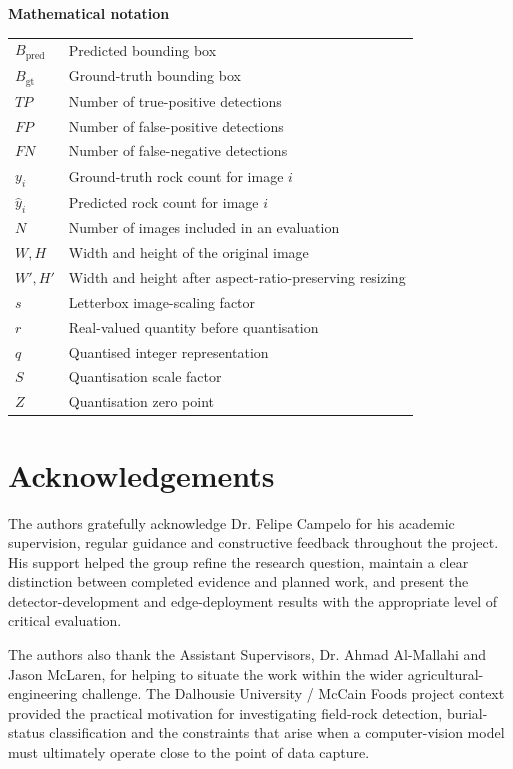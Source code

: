 \documentclass[
                    author={\shortstack{Tanishk Nanasaheb Shinde\\Megh Kashilkar\\Sanskar Sanju Gade\\Jitendra Suwalka}},
                    supervisor={\begin{tabular}[t]{@{}l@{}}Dr. Felipe Campelo\\Assistant Supervisors: Dr. Ahmad Al-Mallahi\\(Dalhousie University / McCain Foods representative) and Jason McLaren\end{tabular}},
                    degree={MSc},
                    title={Edge-Deployable Rock Detection and Burial Status Classification},
                    subtitle={},
                    type={},
                      year={2026}]{dissertation}
\begin{document}
\vspace{0.7cm}
\noindent
\textbf{Mathematical notation}

\vspace{0.3cm}
\begin{tabular}{p{2.7cm}p{11.1cm}}
$B_{\mathrm{pred}}$ & Predicted bounding box \\
$B_{\mathrm{gt}}$ & Ground-truth bounding box \\
$TP$ & Number of true-positive detections \\
$FP$ & Number of false-positive detections \\
$FN$ & Number of false-negative detections \\
$y_i$ & Ground-truth rock count for image $i$ \\
$\hat{y}_i$ & Predicted rock count for image $i$ \\
$N$ & Number of images included in an evaluation \\
$W,H$ & Width and height of the original image \\
$W',H'$ & Width and height after aspect-ratio-preserving resizing \\
$s$ & Letterbox image-scaling factor \\
$r$ & Real-valued quantity before quantisation \\
$q$ & Quantised integer representation \\
$S$ & Quantisation scale factor \\
$Z$ & Quantisation zero point \\
\end{tabular}


\chapter*{Acknowledgements}

\noindent
The authors gratefully acknowledge Dr. Felipe Campelo for his academic supervision,
regular guidance and constructive feedback throughout the project. His support helped the
group refine the research question, maintain a clear distinction between completed evidence
and planned work, and present the detector-development and edge-deployment results with the
appropriate level of critical evaluation.

The authors also thank the Assistant Supervisors, Dr. Ahmad Al-Mallahi and Jason McLaren,
for helping to situate the work within the wider agricultural-engineering challenge. The
Dalhousie University / McCain Foods project context provided the practical motivation for
investigating field-rock detection, burial-status classification and the constraints that
arise when a computer-vision model must ultimately operate close to the point of data capture.
\end{document}
